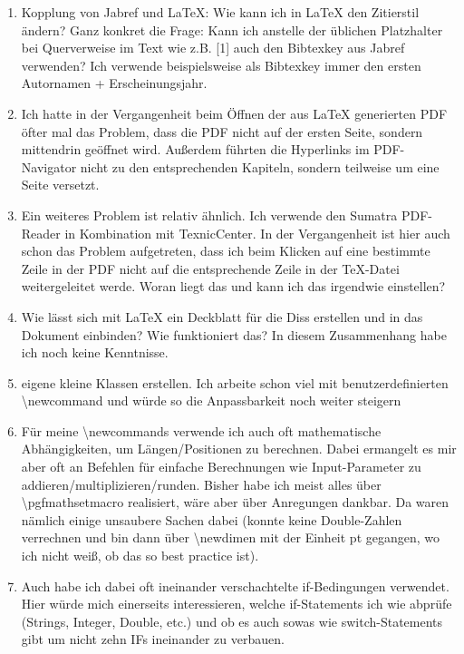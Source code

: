 \documentclass[ngerman]{beamer}
\renewcommand{\aa}{\textasteriskcentered}
\newcommand{\bb}{\textasteriskcentered\textasteriskcentered}
\newcommand{\cc}{\textasteriskcentered\textasteriskcentered\textasteriskcentered}
\begin{document}
\begin{frame}[allowframebreaks]
\begin{enumerate}
\item  
Kopplung von Jabref und LaTeX: Wie kann ich in LaTeX den Zitierstil ändern? Ganz konkret die Frage: Kann ich anstelle der üblichen Platzhalter bei Querverweise im Text wie z.B. [1] auch den Bibtexkey aus Jabref verwenden? Ich verwende beispielsweise als Bibtexkey immer den ersten Autornamen + Erscheinungsjahr. \aa
 
\item 
Ich hatte in der Vergangenheit beim Öffnen der aus LaTeX generierten PDF öfter mal das Problem, dass die PDF nicht auf der ersten Seite, sondern mittendrin geöffnet wird. Außerdem führten die Hyperlinks im PDF-Navigator nicht zu den entsprechenden Kapiteln, sondern teilweise um eine Seite versetzt. \aa 
 
\item 
Ein weiteres Problem ist relativ ähnlich. Ich verwende den Sumatra PDF-Reader in Kombination mit TexnicCenter. In der Vergangenheit ist hier auch schon das Problem aufgetreten, dass ich beim Klicken auf eine bestimmte Zeile in der PDF nicht auf die entsprechende Zeile in der TeX-Datei weitergeleitet werde. Woran liegt das und kann ich das irgendwie einstellen? \aa
 
\item 
Wie lässt sich mit LaTeX ein Deckblatt für die Diss erstellen und in das Dokument einbinden? Wie funktioniert das? In diesem Zusammenhang habe ich noch keine Kenntnisse. \aa

\item eigene kleine Klassen erstellen. Ich arbeite schon viel mit benutzerdefinierten \textbackslash newcommand und würde so die Anpassbarkeit noch weiter steigern \bb

\item Für meine \textbackslash newcommands verwende ich auch oft mathematische Abhängigkeiten, um Längen/Positionen zu berechnen. Dabei ermangelt es mir aber oft an Befehlen für einfache Berechnungen wie Input-Parameter zu addieren/multiplizieren/runden. Bisher habe ich meist alles über \textbackslash  pgfmathsetmacro realisiert, wäre aber über Anregungen dankbar. Da waren nämlich einige unsaubere Sachen dabei (konnte keine Double-Zahlen verrechnen und bin dann über \textbackslash  newdimen mit der Einheit pt gegangen, wo ich nicht weiß, ob das so best practice ist). \cc

\item 
Auch habe ich dabei oft ineinander verschachtelte if-Bedingungen verwendet. Hier würde mich einerseits interessieren, welche if-Statements ich wie abprüfe (Strings, Integer, Double, etc.) und ob es auch sowas wie switch-Statements gibt um nicht zehn IFs ineinander zu verbauen. \bb


\end{enumerate}
\end{frame}
\end{document}
